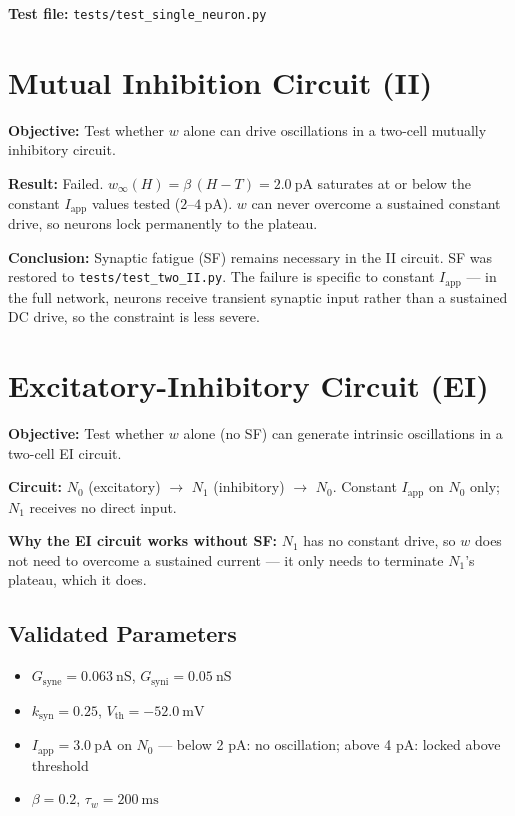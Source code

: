 \documentclass[11pt]{article}
\begin{document}
\textbf{Test file:} \texttt{tests/test\_single\_neuron.py}

\section{Mutual Inhibition Circuit (II)}

\textbf{Objective:} Test whether $w$ alone can drive oscillations in a two-cell mutually inhibitory circuit.

\textbf{Result:} Failed. $w_\infty(H) = \beta\,(H - T) = 2.0\ \text{pA}$ saturates at or below the constant $I_\text{app}$ values tested ($2$--$4\ \text{pA}$). $w$ can never overcome a sustained constant drive, so neurons lock permanently to the plateau.

\textbf{Conclusion:} Synaptic fatigue (SF) remains necessary in the II circuit. SF was restored to \texttt{tests/test\_two\_II.py}. The failure is specific to constant $I_\text{app}$ --- in the full network, neurons receive transient synaptic input rather than a sustained DC drive, so the constraint is less severe.

\section{Excitatory-Inhibitory Circuit (EI)}

\textbf{Objective:} Test whether $w$ alone (no SF) can generate intrinsic oscillations in a two-cell EI circuit.

\textbf{Circuit:} $N_0$ (excitatory) $\to$ $N_1$ (inhibitory) $\to$ $N_0$. Constant $I_\text{app}$ on $N_0$ only; $N_1$ receives no direct input.

\textbf{Why the EI circuit works without SF:} $N_1$ has no constant drive, so $w$ does not need to overcome a sustained current --- it only needs to terminate $N_1$'s plateau, which it does.

\subsection*{Validated Parameters}
\begin{itemize}
  \item $G_\text{syne} = 0.063\ \text{nS}$, \quad $G_\text{syni} = 0.05\ \text{nS}$
  \item $k_\text{syn} = 0.25$, \quad $V_\text{th} = -52.0\ \text{mV}$
  \item $I_\text{app} = 3.0\ \text{pA}$ on $N_0$ --- below 2 pA: no oscillation; above 4 pA: locked above threshold
  \item $\beta = 0.2$, \quad $\tau_w = 200\ \text{ms}$
\end{itemize}
\end{document}
